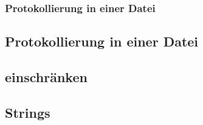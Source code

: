 \begin{frame}
  \frametitle{Protokollierung in einer Datei}

  

\end{frame}

\subsection{Protokollierung in einer Datei}

\subsection{\strace{} einschränken}


\subsection{Strings}
